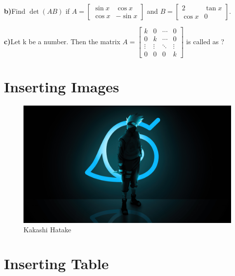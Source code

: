 \documentclass[12pt]{article}
\begin{document}
\textbf{b)}Find $\det (AB)$ if  $A = \begin{bmatrix}
\sin x & \cos x \\ \cos x & -\sin x
\end{bmatrix}$  and  $B = \begin{bmatrix}
2 & \tan x \\ \cos x & 0
\end{bmatrix}$.

\vspace{5mm}
\textbf{c)}Let k be a number. Then the matrix $A = \begin{bmatrix}
k & 0 & \cdots & 0\\
0 & k & \cdots & 0\\
\vdots & \vdots & \ddots & \vdots\\
0 & 0 & 0 & k
\end{bmatrix}$ is called as ?


\newpage
\section{ Inserting Images }
\begin{figure}[h]
\includegraphics[width=1.0\textwidth]{landscape}
\caption{Kakashi Hatake}
\label{fig: Landscape}
\end{figure}

\newpage
\section{ Inserting Table }
\end{document}
